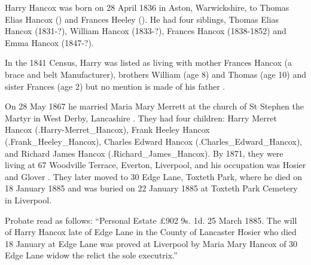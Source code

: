 
Harry Hancox was born on 28 April 1836 in Aston, Warwickshire, to Thomas Elias Hancox () and Frances Heeley ().  He had four siblings, Thomas Elias Hancox (1831-?), 
William Hancox (1833-?), Frances Hancox (1838-1852) and Emma Hancox (1847-?). 

In the 1841 Census, Harry was listed as living with mother Frances Hancox (a brace and belt Manufacturer), brothers William (age 8) and Thomas (age 10) and sister Frances (age 2) but no mention is made of his father \cite{HarryHancoxBirth}.

On 28 May 1867 he married Maria Mary Merrett at the church of St Stephen the Martyr in West Derby, Lancashire \cite{HarryHancoxMarriage}.  They had four children: Harry Merret Hancox (\p.{Harry-Merret_Hancox}), Frank Heeley Hancox (\p.{Frank_Heeley_Hancox}), Charles Edward Hancox (\p.{Charles_Edward_Hancox}), and Richard James Hancox (\p.{Richard_James_Hancox}).
  By 1871, they were living at 67 Woodville Terrace, Everton, Liverpool, and his occupation was Hosier and Glover \cite{HarryHancoxOccupation}.  They later moved to 30 Edge Lane, Toxteth Park, where he died on 18 January 1885 \cite{HarryHancoxDeath} and was buried on 22 January 1885 at Toxteth Park Cemetery in Liverpool.\cite{HHGravestone}

Probate read as follows: ``Personal Estate \pounds 902 9s. 1d. 25 March 1885. The will of Harry Hancox late of Edge Lane in the County of Lancaster Hosier who died 18 January at Edge Lane was proved at Liverpool by Maria Mary Hancox of 30 Edge Lane widow the relict the sole executrix.''




